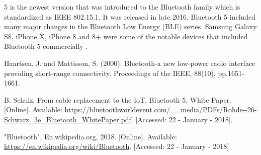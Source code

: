 \documentclass[journal, a4paper]{IEEEtran}
\begin{document}
5 is the newest version that was introduced to the Bluetooth family which is standardized as IEEE 802.15.1. It was released in late 2016. Bluetooth 5 included many major changes in the Bluetooth Low Energy (BLE) series. Samsung Galaxy S8, iPhone X, iPhone 8 and 8+ were some of the notable devices that included Bluetooth 5 commercially \cite{WIKI}. 


\begin{thebibliography}{3}

Haartsen, J. and Mattisson, S. (2000). Bluetooth-a new low-power radio interface providing short-range connectivity. Proceedings of the IEEE, 88(10), pp.1651-1661.

B. Schulz, From cable replacement to the IoT, Bluetooth 5, White Paper. [Online]. Available: \url{https://bluetoothworldevent.com/__media/PDFs/Rohde--26-Schwarz_3e_Bluetooth_WhitePaper.pdf}. [Accessed: 22 - January - 2018].

"Bluetooth", En.wikipedia.org, 2018. [Online]. Available: \url{https://en.wikipedia.org/wiki/Bluetooth}. [Accessed: 22 - January - 2018]

\end{thebibliography}
\end{document}
